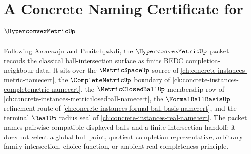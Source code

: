 \chapter{A Concrete Naming Certificate for $\HyperconvexMetricUp$}
\label{ch:concrete-instances-hyperconvex-metric-namecert}

Following Aronszajn and Panitchpakdi, the $\HyperconvexMetricUp$ packet records the classical ball-intersection surface as finite BEDC completion-neighbour data. It sits over the $\MetricSpaceUp$ source of \autoref{ch:concrete-instances-metric-namecert}, the $\CompleteMetricUp$ boundary of \autoref{ch:concrete-instances-completemetric-namecert}, the $\MetricClosedBallUp$ membership row of \autoref{ch:concrete-instances-metricclosedball-namecert}, the $\FormalBallBasisUp$ refinement route of \autoref{ch:concrete-instances-formal-ball-basis-namecert}, and the terminal $\RealUp$ radius seal of \autoref{ch:concrete-instances-real-namecert}. The packet names pairwise-compatible displayed balls and a finite intersection handoff; it does not select a global hull point, quotient completion representative, arbitrary family intersection, choice function, or ambient real-completeness principle.

